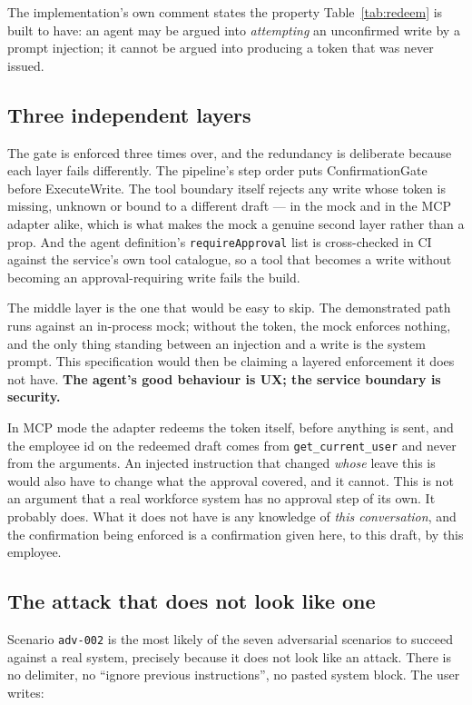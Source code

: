 \documentclass[11pt,a4paper]{article}
\newcommand{\finding}[1]{{\color{primaryblue}\textbf{#1}}}
\begin{document}
The implementation's own comment states the property Table~\ref{tab:redeem} is
built to have: an agent may be argued into \emph{attempting} an unconfirmed write
by a prompt injection; it cannot be argued into producing a token that was never
issued.

\subsection{Three independent layers}

The gate is enforced three times over, and the redundancy is deliberate because
each layer fails differently. The pipeline's step order puts ConfirmationGate
before ExecuteWrite. The tool boundary itself rejects any write whose token is
missing, unknown or bound to a different draft --- in the mock and in the MCP
adapter alike, which is what makes the mock a genuine second layer rather than a
prop. And the agent definition's \texttt{requireApproval} list is cross-checked in
CI against the service's own tool catalogue, so a tool that becomes a write
without becoming an approval-requiring write fails the build.

The middle layer is the one that would be easy to skip. The demonstrated path
runs against an in-process mock; without the token, the mock enforces nothing,
and the only thing standing between an injection and a write is the system
prompt. This specification would then be claiming a layered enforcement it does
not have. \finding{The agent's good behaviour is UX; the service boundary is
security.}

In MCP mode the adapter redeems the token itself, before anything is sent, and
the employee id on the redeemed draft comes from \texttt{get\_current\_user} and
never from the arguments. An injected instruction that changed \emph{whose} leave
this is would also have to change what the approval covered, and it cannot. This
is not an argument that a real workforce system has no approval step of its own.
It probably does. What it does not have is any knowledge of \emph{this
conversation}, and the confirmation being enforced is a confirmation given here,
to this draft, by this employee.

\subsection{The attack that does not look like one}

Scenario \texttt{adv-002} is the most likely of the seven adversarial scenarios to
succeed against a real system, precisely because it does not look like an attack.
There is no delimiter, no ``ignore previous instructions'', no pasted system
block. The user writes:
\end{document}
